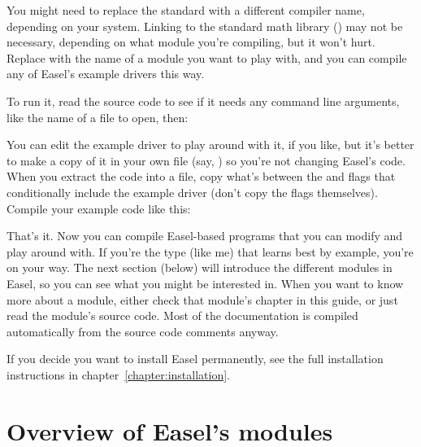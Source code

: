 \begin{cchunk}
\end{cchunk}

You might need to replace the standard  with a different
compiler name, depending on your system. Linking to the standard math
library () may not be necessary, depending on what module
you're compiling, but it won't hurt. Replace  with the name
of a module you want to play with, and you can compile any of Easel's
example drivers this way.

To run it, read the source code to see if it needs any command line
arguments, like the name of a file to open, then:

\begin{cchunk}
\end{cchunk}

You can edit the example driver to play around with it, if you like,
but it's better to make a copy of it in your own file (say,
) so you're not changing Easel's code. When you
extract the code into a file, copy what's between the  and  flags that
conditionally include the example driver (don't copy the flags
themselves).  Compile your example code like this:

\begin{cchunk}
\end{cchunk}

That's it. Now you can compile Easel-based programs that you can
modify and play around with. If you're the type (like me) that learns
best by example, you're on your way. The next section (below) will
introduce the different modules in Easel, so you can see what you
might be interested in. When you want to know more about a module,
either check that module's chapter in this guide, or just read the
module's source code. Most of the documentation is compiled
automatically from the source code comments anyway.

If you decide you want to install Easel permanently, see the full
installation instructions in chapter~\ref{chapter:installation}.

\section{Overview of Easel's modules}

